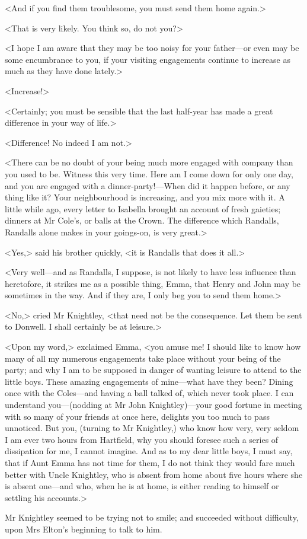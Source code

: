 <And if you find them troublesome, you must send them home again.>

<That is very likely. You think so, do not you?>

<I hope I am aware that they may be too noisy for your father—or even may be some encumbrance to you, if your visiting engagements continue to increase as much as they have done lately.>

<Increase!>

<Certainly; you must be sensible that the last half-year has made a great difference in your way of life.>

<Difference! No indeed I am not.>

<There can be no doubt of your being much more engaged with company than you used to be. Witness this very time. Here am I come down for only one day, and you are engaged with a dinner-party!—When did it happen before, or any thing like it? Your neighbourhood is increasing, and you mix more with it. A little while ago, every letter to Isabella brought an account of fresh gaieties; dinners at Mr Cole's, or balls at the Crown. The difference which Randalls, Randalls alone makes in your goings-on, is very great.>

<Yes,> said his brother quickly, <it is Randalls that does it all.>

<Very well—and as Randalls, I suppose, is not likely to have less influence than heretofore, it strikes me as a possible thing, Emma, that Henry and John may be sometimes in the way. And if they are, I only beg you to send them home.>

<No,> cried Mr Knightley, <that need not be the consequence. Let them be sent to Donwell. I shall certainly be at leisure.>

<Upon my word,> exclaimed Emma, <you amuse me! I should like to know how many of all my numerous engagements take place without your being of the party; and why I am to be supposed in danger of wanting leisure to attend to the little boys. These amazing engagements of mine—what have they been? Dining once with the Coles—and having a ball talked of, which never took place. I can understand you—(nodding at Mr John Knightley)—your good fortune in meeting with so many of your friends at once here, delights you too much to pass unnoticed. But you, (turning to Mr Knightley,) who know how very, very seldom I am ever two hours from Hartfield, why you should foresee such a series of dissipation for me, I cannot imagine. And as to my dear little boys, I must say, that if Aunt Emma has not time for them, I do not think they would fare much better with Uncle Knightley, who is absent from home about five hours where she is absent one—and who, when he is at home, is either reading to himself or settling his accounts.>

Mr Knightley seemed to be trying not to smile; and succeeded without difficulty, upon Mrs Elton's beginning to talk to him.
